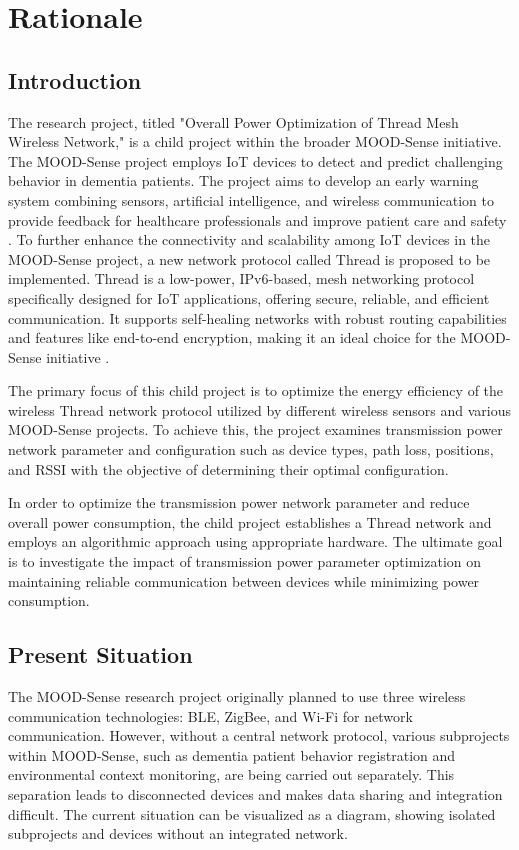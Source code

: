 \chapter{Rationale}\label{chap:rationale}

\section{Introduction}

The research project, titled "Overall Power Optimization of Thread Mesh Wireless Network," is a child project within the broader MOOD-Sense initiative. The MOOD-Sense project employs IoT devices to detect and predict challenging behavior in dementia patients. The project aims to develop an early warning system combining sensors, artificial intelligence, and wireless communication to provide feedback for healthcare professionals and improve patient care and safety \cite{MOOD-Sense_Research}. To further enhance the connectivity and scalability among IoT devices in the MOOD-Sense project, a new network protocol called Thread is proposed to be implemented. Thread is a low-power, IPv6-based, mesh networking protocol specifically designed for IoT applications, offering secure, reliable, and efficient communication. It supports self-healing networks with robust routing capabilities and features like end-to-end encryption, making it an ideal choice for the MOOD-Sense initiative \cite{Thread_Group_Benefits}.

The primary focus of this child project is to optimize the energy efficiency of the wireless Thread network protocol utilized by different wireless sensors and various MOOD-Sense projects. To achieve this, the project examines transmission power network parameter and configuration such as device types, path loss, positions, and RSSI with the objective of determining their optimal configuration.

In order to optimize the transmission power network parameter and reduce overall power consumption, the child project establishes a Thread network and employs an algorithmic approach using appropriate hardware. The ultimate goal is to investigate the impact of transmission power parameter optimization on maintaining reliable communication between devices while minimizing power consumption.


\section{Present Situation}\label{sec:present_situation}
The MOOD-Sense research project originally planned to use three wireless communication technologies: BLE, ZigBee, and Wi-Fi for network communication. However, without a central network protocol, various subprojects within MOOD-Sense, such as dementia patient behavior registration and environmental context monitoring, are being carried out separately. This separation leads to disconnected devices and makes data sharing and integration difficult. The current situation can be visualized as a diagram, showing isolated subprojects and devices without an integrated network.

